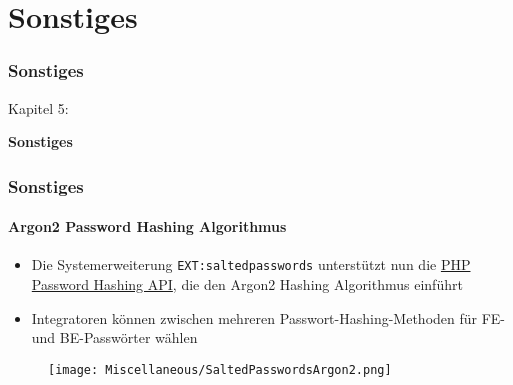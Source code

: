 %

\section{Sonstiges}
\begin{frame}[fragile]
	\frametitle{Sonstiges}

	\begin{center}\huge{Kapitel 5:}\end{center}
	\begin{center}\huge{\color{typo3darkgrey}\textbf{Sonstiges}}\end{center}

\end{frame}


\begin{frame}[fragile]
	\frametitle{Sonstiges}
	\framesubtitle{Argon2 Password Hashing Algorithmus}

	\begin{itemize}
		\item Die Systemerweiterung \texttt{EXT:saltedpasswords} unterstützt nun die
			\href{https://secure.php.net/manual/en/ref.password.php}{PHP Password Hashing API},
			die den Argon2 Hashing Algorithmus einführt
		\item Integratoren können zwischen mehreren Passwort-Hashing-Methoden für
			FE- und BE-Passwörter wählen
	\end{itemize}

	\begin{figure}
		\texttt{[image: Miscellaneous/SaltedPasswordsArgon2.png]}
	\end{figure}


\end{frame}


